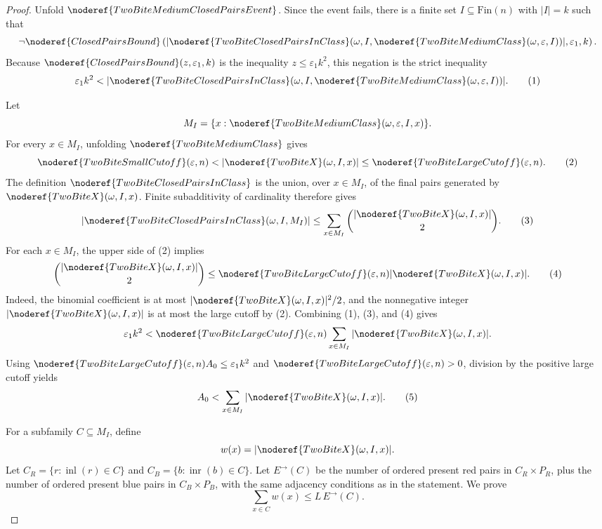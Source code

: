 \begin{proof}
Unfold \(\noderef{TwoBiteMediumClosedPairsEvent}\).  Since the event fails,
there is a finite set \(I\subseteq\mathrm{Fin}(n)\) with \(|I|=k\) such that
\[
\neg\noderef{ClosedPairsBound}\left(
|\noderef{TwoBiteClosedPairsInClass}(\omega,I,
  \noderef{TwoBiteMediumClass}(\omega,\varepsilon,I))|,
  \varepsilon_1,k\right).
\]
Because \(\noderef{ClosedPairsBound}(z,\varepsilon_1,k)\) is the inequality
\(z\le \varepsilon_1 k^2\), this negation is the strict inequality
\[
\varepsilon_1k^2<
|\noderef{TwoBiteClosedPairsInClass}(\omega,I,
  \noderef{TwoBiteMediumClass}(\omega,\varepsilon,I))|. \tag{1}
\]

Let
\[
M_I=\{x:\noderef{TwoBiteMediumClass}(\omega,\varepsilon,I,x)\}.
\]
For every \(x\in M_I\), unfolding \(\noderef{TwoBiteMediumClass}\) gives
\[
\noderef{TwoBiteSmallCutoff}(\varepsilon,n)
<|\noderef{TwoBiteX}(\omega,I,x)|
\le \noderef{TwoBiteLargeCutoff}(\varepsilon,n). \tag{2}
\]
The definition \(\noderef{TwoBiteClosedPairsInClass}\) is the union, over
\(x\in M_I\), of the final pairs generated by
\(\noderef{TwoBiteX}(\omega,I,x)\).  Finite subadditivity of cardinality
therefore gives
\[
|\noderef{TwoBiteClosedPairsInClass}(\omega,I,M_I)|
\le \sum_{x\in M_I}\binom{|\noderef{TwoBiteX}(\omega,I,x)|}{2}. \tag{3}
\]
For each \(x\in M_I\), the upper side of (2) implies
\[
\binom{|\noderef{TwoBiteX}(\omega,I,x)|}{2}
\le
\noderef{TwoBiteLargeCutoff}(\varepsilon,n)
  |\noderef{TwoBiteX}(\omega,I,x)|. \tag{4}
\]
Indeed, the binomial coefficient is at most
\(|\noderef{TwoBiteX}(\omega,I,x)|^2/2\), and the nonnegative integer
\(|\noderef{TwoBiteX}(\omega,I,x)|\) is at most the large cutoff by (2).
Combining (1), (3), and (4) gives
\[
\varepsilon_1k^2<
\noderef{TwoBiteLargeCutoff}(\varepsilon,n)
\sum_{x\in M_I}|\noderef{TwoBiteX}(\omega,I,x)|.
\]
Using
\(\noderef{TwoBiteLargeCutoff}(\varepsilon,n)A_0\le\varepsilon_1k^2\) and
\(\noderef{TwoBiteLargeCutoff}(\varepsilon,n)>0\), division by the positive
large cutoff yields
\[
A_0<\sum_{x\in M_I}|\noderef{TwoBiteX}(\omega,I,x)|. \tag{5}
\]

For a subfamily \(C\subseteq M_I\), define
\[
w(x)=|\noderef{TwoBiteX}(\omega,I,x)|.
\]
Let \(C_R=\{r:\operatorname{inl}(r)\in C\}\) and
\(C_B=\{b:\operatorname{inr}(b)\in C\}\).  Let \(E^\rightarrow(C)\) be the
number of ordered present red pairs in \(C_R\times P_R\), plus the number of
ordered present blue pairs in \(C_B\times P_B\), with the same adjacency
conditions as in the statement.  We prove
\[
\sum_{x\in C}w(x)\le L\,E^\rightarrow(C). \tag{6}
\]


\end{proof}
